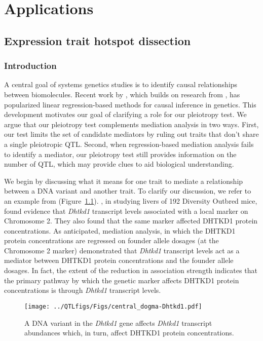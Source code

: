 \documentclass[oneside]{book}
\begin{document}


\chapter{Applications}
\section{Expression trait hotspot dissection}
\subsection{Introduction}

A central goal of systems genetics studies is to identify causal relationships between biomolecules. Recent work by \citet{chick2016defining}, which builds on research from \citet{baron1986moderator}, has popularized linear regression-based methods for causal inference in genetics. This development motivates our goal of clarifying a role for our pleiotropy test. We argue that our pleiotropy test complements mediation analysis in two ways. First, our test limits the set of candidate mediators by ruling out traits that don't share a single pleiotropic QTL. Second, when regression-based mediation analysis fails to identify a mediator, our pleiotropy test still provides information on the number of QTL, which may provide clues to aid biological understanding.


We begin by discussing what it means for one trait to mediate a relationship between a 
DNA variant and another trait. To clarify our discussion, we refer to an example from 
\citet{chick2016defining} (Figure~\ref{fig:Dhtkd1}). \citet{chick2016defining}, in 
studying livers of 192 Diversity Outbred mice, found evidence that \emph{Dhtkd1} 
transcript levels associated with a local marker on Chromosome 2. They also found that 
the same marker affected DHTKD1 protein concentrations. 
As anticipated, mediation analysis, in which the DHTKD1 protein concentrations are
regressed on founder allele dosages (at the Chromosome 2 marker) demonstrated that
\emph{Dhtkd1} transcript levels act as a mediator between DHTKD1 protein concentrations 
and the founder allele dosages. In fact, the extent of the reduction in association 
strength indicates that the primary pathway by which the genetic marker affects DHTKD1 
protein concentrations is through \emph{Dhtkd1} transcript levels.

\begin{figure}
  \centering
  \texttt{[image: ../QTLfigs/Figs/central\_dogma-Dhtkd1.pdf]}
  \caption{A DNA variant in the \emph{Dhtkd1} gene affects \emph{Dhtkd1} transcript abundances which, in turn, affect DHTKD1 protein concentrations.}\label{fig:Dhtkd1}
\end{figure}
\end{document}
